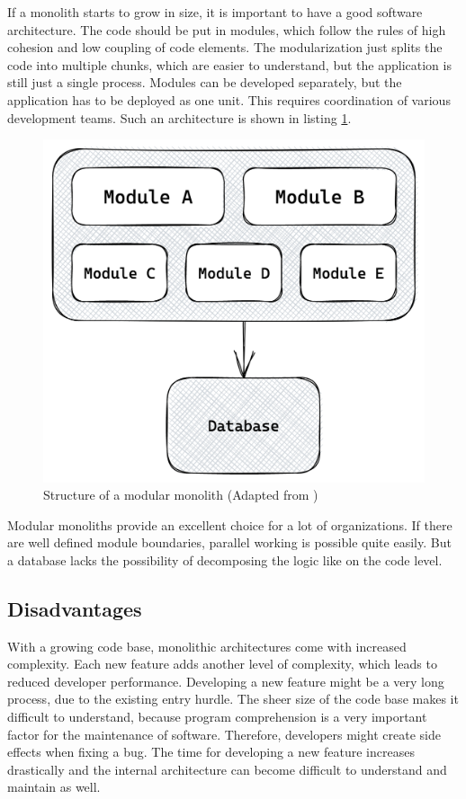 \noindent If a monolith starts to grow in size, it is important to have a good software architecture. The code should be put in modules, which follow the rules of high cohesion and low coupling of code elements. The modularization just splits the code into multiple chunks, which are easier to understand, but the application is still just a single process. Modules can be developed separately, but the application has to be deployed as one unit. This requires coordination of various development teams. \cite[12-13]{book:2018:richardson:background:bff:microservices-patterns} \cite[12-13]{book:2019:newman:background:monolith:monolith-to-microservices} Such an architecture is shown in listing \ref{fig:background:monolith:module-monolith-sketch}.

\ifshowImages
\begin{figure}[H]
    \centering
    \includegraphics[width=0.4\linewidth]{images/background/monolith/modular-monolith-sketch.png}
    \caption{Structure of a modular monolith (Adapted from \cite[13]{book:2019:newman:background:monolith:monolith-to-microservices})}\label{fig:background:monolith:module-monolith-sketch}
\end{figure}
\fi

\noindent Modular monoliths provide an excellent choice for a lot of organizations. If there are well defined module boundaries, parallel working is possible quite easily. But a database lacks the possibility of decomposing the logic like on the code level. \cite[12-13]{book:2019:newman:background:monolith:monolith-to-microservices}

\subsection{Disadvantages}\label{subsection:background:software-monolith:disadvantages}

With a growing code base, monolithic architectures come with increased complexity. Each new feature adds another level of complexity, which leads to reduced developer performance. Developing a new feature might be a very long process, due to the existing entry hurdle. The sheer size of the code base makes it difficult to understand, because program comprehension is a very important factor for the maintenance of software. \cite{article:1995:mayrhauser:background:monoliths:program-comprehension-during-software-maintenance-and-evolution} Therefore, developers might create side effects when fixing a bug. The time for developing a new feature increases drastically and the internal architecture can become difficult to understand and maintain as well. \cite[4-6]{book:2018:richardson:background:bff:microservices-patterns}

